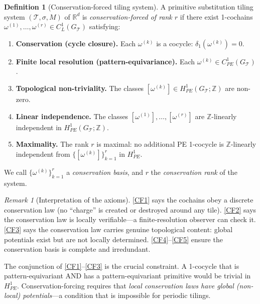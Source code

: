 \documentclass[12pt]{article}
\theoremstyle{definition}
\newtheorem{definition}[theorem]{Definition}
\theoremstyle{remark}
\newtheorem{remark}[theorem]{Remark}
\newcommand{\RR}{\mathbb{R}}
\newcommand{\ZZ}{\mathbb{Z}}
\begin{document}
\begin{definition}[Conservation-forced tiling system]
\label{def:conservation-forced}
A primitive substitution tiling system $(\mathcal{T}, \sigma, M)$ of $\RR^d$ is \emph{conservation-forced of rank $r$} if there exist 1-cochains $\omega^{(1)}, \ldots, \omega^{(r)} \in C^1_L(G_{\mathcal{T}})$ satisfying:

\begin{enumerate}[label=\textbf{(CF\arabic*)}]
\item \label{CF1} \textbf{Conservation (cycle closure).} Each $\omega^{(k)}$ is a cocycle: $\delta_1(\omega^{(k)}) = 0$.

\item \label{CF2} \textbf{Finite local resolution (pattern-equivariance).} Each $\omega^{(k)} \in C^1_{PE}(G_{\mathcal{T}})$.

\item \label{CF3} \textbf{Topological non-triviality.} The classes $[\omega^{(k)}] \in H^1_{PE}(G_{\mathcal{T}}; \ZZ)$ are non-zero.

\item \label{CF4} \textbf{Linear independence.} The classes $[\omega^{(1)}], \ldots, [\omega^{(r)}]$ are $\ZZ$-linearly independent in $H^1_{PE}(G_{\mathcal{T}}; \ZZ)$.

\item \label{CF5} \textbf{Maximality.} The rank $r$ is maximal: no additional PE 1-cocycle is $\ZZ$-linearly independent from $\{[\omega^{(k)}]\}_{k=1}^r$ in $H^1_{PE}$.
\end{enumerate}

We call $\{\omega^{(k)}\}_{k=1}^r$ a \emph{conservation basis}, and $r$ the \emph{conservation rank} of the system.
\end{definition}

\begin{remark}[Interpretation of the axioms]
\ref{CF1} says the cochains obey a discrete conservation law (no ``charge'' is created or destroyed around any tile). \ref{CF2} says the conservation law is locally verifiable---a finite-resolution observer can check it. \ref{CF3} says the conservation law carries genuine topological content: global potentials exist but are not locally determined. \ref{CF4}--\ref{CF5} ensure the conservation basis is complete and irredundant.

The conjunction of \ref{CF1}--\ref{CF3} is the crucial constraint. A 1-cocycle that is pattern-equivariant AND has a pattern-equivariant primitive would be trivial in $H^1_{PE}$. Conservation-forcing requires that \emph{local conservation laws have global (non-local) potentials}---a condition that is impossible for periodic tilings.
\end{remark}
\end{document}
